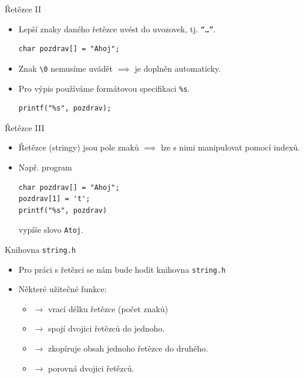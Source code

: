 \documentclass[14pt,aspectratio=169]{beamer}
\begin{document}
    \begin{frame}[t,fragile]{Řetězce \textrm{II}}
        \begin{itemize}
            \item Lepší znaky daného řetězce uvést do uvozovek, tj. \texttt{\textquotedblleft\dots\textquotedblright}.
            \begin{lstlisting}
char pozdrav[] = "Ahoj";
            \end{lstlisting}
            \item Znak \texttt{\textbackslash0} nemusíme uvádět $\implies$ je doplněn automaticky.
            \item Pro výpis používáme formátovou specifikaci \texttt{\%s}.
            \begin{lstlisting}
printf("%s", pozdrav);
            \end{lstlisting}
        \end{itemize}
    \end{frame}

    \begin{frame}[t,fragile]{Řetězce \textrm{III}}
        \begin{itemize}
            \item Řetězce (stringy) jsou pole znaků $\implies$ lze s nimi manipulovat pomocí indexů.
            \item Např. program
            \begin{lstlisting}
char pozdrav[] = "Ahoj";
pozdrav[1] = 't';
printf("%s", pozdrav)
            \end{lstlisting}
            vypíše slovo \texttt{Atoj}.
        \end{itemize}
    \end{frame}

    \begin{frame}[t,fragile]{Knihovna \texttt{string.h}}
        \begin{itemize}
            \item Pro práci s řetězci se nám bude hodit knihovna \texttt{string.h}
            \item Některé užitečné funkce:
            \begin{itemize}
                \item {} $\rightarrow$ vrací délku řetězce (počet znaků)
                \item {} $\rightarrow$ spojí dvojici řetězců do jednoho.
                \item {} $\rightarrow$ zkopíruje obsah jednoho řetězce do druhého.
                \item {} $\rightarrow$ porovná dvojici řetězců.
            \end{itemize}
        \end{itemize}
    \end{frame}
\end{document}
